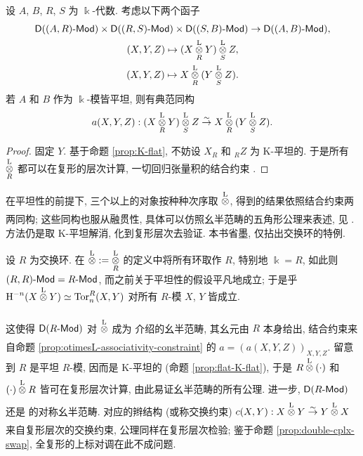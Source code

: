 \begin{proposition}[结合约束]\label{prop:otimesL-associativity-constraint}
	设 $A$, $B$, $R$, $S$ 为 $\Bbbk$-代数. 考虑以下两个函子
	\begin{gather*}
		\cate{D}((A,R)\dcate{Mod}) \times \cate{D}((R,S)\dcate{Mod}) \times \cate{D}((S,B)\dcate{Mod}) \to \cate{D}((A,B)\dcate{Mod}), \\
		(X, Y, Z) \mapsto (X \otimesL[R] Y) \otimesL[S] Z, \\
		(X, Y, Z) \mapsto X \otimesL[R] (Y \otimesL[S] Z).
	\end{gather*}
	若 $A$ 和 $B$ 作为 $\Bbbk$-模皆平坦, 则有典范同构
	\[ a(X,Y,Z): (X \otimesL[R] Y) \otimesL[S] Z \rightiso X \otimesL[R] (Y \otimesL[S] Z). \]
\end{proposition}
\begin{proof}
	固定 $Y$. 基于命题 \ref{prop:K-flat},	不妨设 $X_R$ 和 ${}_R Z$ 为 K-平坦的. 于是所有 $\otimesL[R]$ 都可以在复形的层次计算, 一切回归张量积的结合约束 \cite[命题 6.5.12]{Li1}.
\end{proof}

在平坦性的前提下, 三个以上的对象按种种次序取 $\otimesL$, 得到的结果依照结合约束两两同构; 这些同构也服从融贯性, 具体可以仿照幺半范畴的五角形公理来表述, 见 \cite[定义 3.1.1]{Li1}. 方法仍是取 K-平坦解消, 化到复形层次去验证. 本书省墨, 仅拈出交换环的特例.

\begin{example}\label{eg:commutative-otimesL}
	设 $R$ 为交换环. 在 $\otimesL := \otimesL[R]$ 的定义中将所有环取作 $R$, 特别地 $\Bbbk = R$, 如此则 $(R,R)\dcate{Mod} = R\dcate{Mod}$, 而之前关于平坦性的假设平凡地成立; 于是乎 $\Hm^{-n}(X \otimesL Y) \simeq \Tor^R_n(X,Y)$ 对所有 $R$-模 $X$, $Y$ 皆成立.
	
	这使得 $\cate{D}(R\dcate{Mod})$ 对 $\otimesL$ 成为 \cite[\S 3.1]{Li1} 介绍的幺半范畴, 其幺元由 $R$ 本身给出, 结合约束来自命题 \ref{prop:otimesL-associativity-constraint} 的 $a = (a(X,Y,Z))_{X,Y,Z}$. 留意到 $R$ 是平坦 $R$-模, 因而是 K-平坦的 (命题 \ref{prop:flat-K-flat}), 于是 $R \otimesL (\cdot)$ 和 $(\cdot) \otimesL R$ 皆可在复形层次计算, 由此易证幺半范畴的所有公理. 进一步, $\cate{D}(R\dcate{Mod})$ 还是 \cite[定义 3.3.1]{Li1} 的对称幺半范畴. 对应的辫结构 (或称交换约束) $c(X,Y): X \otimesL Y \rightiso Y \otimesL X$ 来自复形层次的交换约束, 公理同样在复形层次检验; 鉴于命题 \ref{prop:double-cplx-swap}, 全复形的上标对调在此不成问题.
\end{example}

